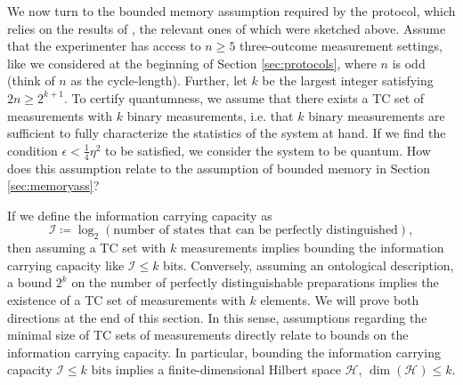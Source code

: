 We now turn to the bounded memory assumption required by the protocol, which relies on the results of \cite{Pusey2019a}, the relevant ones of which were sketched above. Assume that the experimenter has access to $n\geq 5$ three-outcome measurement settings, like we considered at the beginning of Section \ref{sec:protocols}, where $n$ is odd (think of $n$ as the cycle-length). Further, let $k$ be the largest integer satisfying $2n\geq 2^{k+1}$. To certify quantumness, we assume that there exists a TC set of measurements with $k$ binary measurements, i.e. that $k$ binary measurements are sufficient to fully characterize the statistics of the system at hand. If we find the condition $\epsilon<\frac{1}{4}\eta^2$ to be satisfied, we consider the system to be quantum.  How does this assumption relate to the assumption of bounded memory in Section \ref{sec:memoryass}? 

If we define the information carrying capacity as 
\begin{equation*}
\mathcal{I}\coloneqq \log_2(\text{number of states that can be perfectly distinguished}),
\end{equation*}
then assuming a TC set with $k$ measurements implies bounding the information carrying capacity like $\mathcal{I}\leq k$ bits. Conversely, assuming an ontological description, a bound $2^k$ on the number of perfectly distinguishable preparations implies the existence of a TC set of measurements with $k$ elements. We will prove both directions at the end of this section. In this sense, assumptions regarding the minimal size of TC sets of measurements directly relate to bounds on the information carrying capacity. In particular, bounding the information carrying capacity $\mathcal{I}\leq k \text{ bits}$ implies a finite-dimensional Hilbert space $\mathcal{H}$, $\operatorname{dim}(\mathcal{H})\leq k$.

